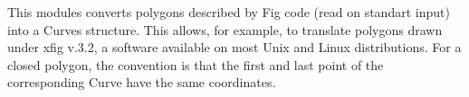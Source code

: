 This modules converts polygons described by Fig code (read on standart
input) into a Curves structure. This allows, for example, to translate
polygons drawn under xfig v.3.2,
a software available on most Unix and Linux distributions.
For a closed polygon, the convention is that the first and last
point of the corresponding Curve have the same coordinates.
